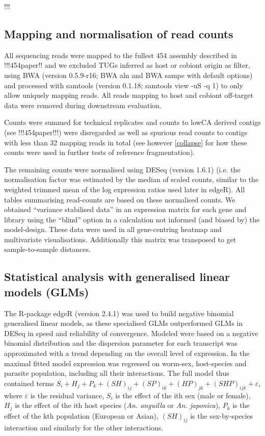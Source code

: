 !!!

\subsection{Mapping and normalisation of read counts}

All sequencing reads were mapped to the fullest 454 assembly described
in !!!454paper!! and we excluded TUGs inferred as host or cobiont
origin as filter, using BWA \cite{pmid20080505} (version 0.5.9-r16;
BWA aln and BWA sampe with default options) and processed with
samtools \cite{journals/bioinformatics/LiHWFRHMAD09} (version 0.1.18;
samtools view -uS -q 1) to only allow uniquely mapping reads. All
reads mapping to host and cobiont off-target data were removed during
downstream evaluation.

Counts were summed for technical replicates and counts to lowCA
derived contigs (see !!!454paper!!!) were disregarded as well as
spurious read counts to contigs with less than 32 mapping reads in
total (see however \ref{collapse} for how these counts were used in
further tests of reference fragmentation).

The remaining counts were normalised using DESeq (version 1.6.1) (i.e.
the normalisation factor was estimated by the median of scaled counts,
similar to the weighted trimmed mean of the log expression ratios used
later in edgeR). All tables summarising read-counts are based on these
normalised counts. We obtained ``variance stabilised data'' in an
expression matrix for each gene and library using the ``blind'' option
in a calculation not informed (and biased by) the model-design. These
data were used in all gene-centring heatmap and multivariate
visualisations. Additionally this matrix was transposed to get
sample-to-sample distances.

\subsection{Statistical analysis with generalised linear models (GLMs)}

The R-package edgeR (version 2.4.1) \cite{pmid19910308} was used to
build negative binomial generalised linear models, as these
specialised GLMs outperformed GLMs in DESeq in speed and reliability
of convergence. Modeled were based on a negative binomial distribution
and the dispersion parameter for each transcript was approximated with
a trend depending on the overall level of expression. In the maximal
fitted model expression was regressed on worm-sex, host-species and
parasite population, including all their interactions. The full model
thus contained terms $ S_i + H_j + P_k + (SH)_{ij} + (SP)_{ik} +
(HP)_{jk} + (SHP)_{ijk} + \varepsilon$, where $\varepsilon$ is the
residual variance, $S_i$ is the effect of the ith sex (male or
female), $H_j$ is the effect of the ith host species
(\textit{An. anguilla} or \textit{An. japonica}), $P_k$ is the effect
of the kth population (European or Asian), $(SH)_{ij}$ is the
sex-by-species interaction and similarly for the other interactions.

